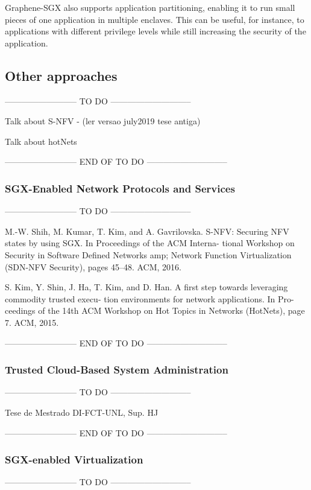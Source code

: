 Graphene-SGX also supports application partitioning, enabling it to run small pieces of one application in multiple enclaves. This can be useful, for instance, to applications with different privilege levels while still increasing the security of the application.
\subsection{Other approaches}
-------------------------- TO DO -----------------------------

Talk about S-NFV - (ler versao july2019 tese antiga)

Talk about hotNets

-------------------------- END OF TO DO -----------------------------


\subsubsection{SGX-Enabled Network Protocols and Services}
-------------------------- TO DO -----------------------------

M.-W. Shih, M. Kumar, T. Kim, and A. Gavrilovska. S-NFV: Securing NFV states by
using SGX. In Proceedings of the ACM Interna- tional Workshop on Security in
Software Defined Networks amp; Network Function Virtualization (SDN-NFV Security),
pages 45–48. ACM, 2016.

S. Kim, Y. Shin, J. Ha, T. Kim, and D. Han. A first step towards leveraging commodity
trusted execu- tion environments for network applications. In Pro- ceedings of the
14th ACM Workshop on Hot Topics in Networks (HotNets), page 7. ACM, 2015.

-------------------------- END OF TO DO -----------------------------

\subsubsection{Trusted Cloud-Based System Administration}
-------------------------- TO DO -----------------------------

Tese de Mestrado DI-FCT-UNL, Sup. HJ

-------------------------- END OF TO DO -----------------------------

\subsubsection{SGX-enabled Virtualization}
-------------------------- TO DO -----------------------------

